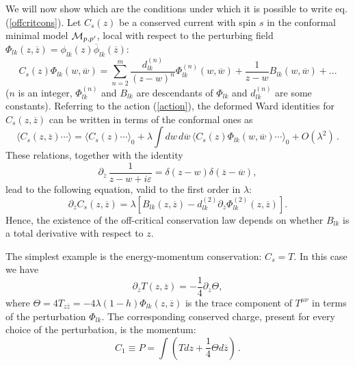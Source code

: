 \documentclass[a4paper,12pt]{report}
\begin{document}
\vspace{0.5cm}

We will now show which are the conditions under which it is possible to write eq.(\ref{offcritcons}). Let
$C_{s}(z)$ be a conserved current with spin $s$ in the conformal minimal model ${\cal M}_{p,p'}$, local with
respect to the perturbing field $\Phi _{lk}\left(z,\overline{z}\right)=\phi
_{lk}\left(z\right)\overline{\phi}_{lk}\left(\overline{z} \right)$:
\begin{equation}
C_{s}(z)\Phi _{lk}\left(w,\overline{w} \right)=\sum _{n=2}^{m}\frac{d_{lk}^{(n)}}{\left(z-w \right)^{n}}\Phi
_{lk}^{(n)}\left(w,\overline{w} \right)+\frac{1}{z-w}B_{lk}\left(w,\overline{w} \right)+...
\end{equation}
($n$ is an integer, $ \Phi _{lk}^{(n)}$ and $ B_{lk}$ are descendants of $ \Phi _{lk}$ and $ d_{lk}^{(n)}$ are
some constants). Referring to the action (\ref{action}), the deformed Ward identities for $C_{s}(z,\overline{z})$
can be written in terms of the conformal ones as
\begin{equation}
\langle C_{s}\left(z,\overline{z} \right)\cdots \rangle =\langle C_{s}\left(z \right)\cdots \rangle_{0}+\lambda
\int dw\, d\overline{w}\,\langle C_{s}\left(z\right)\Phi _{lk}\left(w,\overline{w} \right)\cdots
\rangle_{0}+O\left(\lambda ^{2} \right)\,.
\end{equation}
These relations, together with the identity
\begin{equation}
\partial _{\overline{z}}\,\frac{1}{z-w+i\varepsilon }=\delta \left(z-w \right)\delta \left(\overline{z}-\overline{w} \right),
\end{equation}
lead to the following equation, valid to the first order in $\lambda$:
\begin{equation}
\partial _{\overline{z}}C_{s}\left(z,\overline{z} \right)=\lambda \left[B_{lk}\left(z,\overline{z} \right)-d_{lk}^{(2)}\partial _{z}\Phi_{lk}^{(2)} \left(z,\overline{z} \right) \right].
\end{equation}
Hence, the existence of the off-critical conservation law depends on whether $B_{lk}$ is a total derivative with
respect to $z$.

\vspace{0.5cm}

The simplest example is the energy-momentum conservation: $C_{s}=T$. In this case we have
\begin{equation}
\partial _{\overline{z}}T\left(z,\overline{z} \right)=-\frac{1}{4}\partial _{z}\Theta ,
\end{equation}
where $\Theta=4T_{z\overline{z}}=-4\lambda\left(1-h\right)\Phi_{lk}\left(z,\overline{z}\right)$ is the trace
component of $T^{\mu\nu}$ in terms of the perturbation $\Phi_{lk}$. The corresponding conserved charge, present
for every choice of the perturbation, is the momentum:
\begin{equation}
C_{1}\equiv P=\int\left(T dz+\frac{1}{4}\Theta d \overline{z}\right)\,.
\end{equation}
\end{document}
